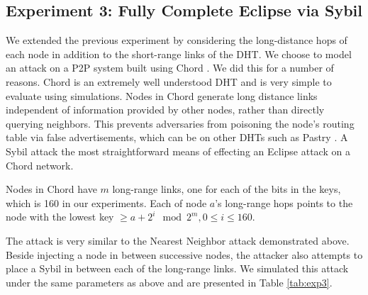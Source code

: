 \documentclass[a4paper]{article}
\begin{document}
\subsection{Experiment 3: Fully Complete Eclipse via Sybil}
We extended the previous experiment by considering the long-distance hops of each node in addition to the short-range links of the DHT.
We choose to model an attack on a P2P system built using Chord \cite{chord}.
We did this for a number of reasons.
Chord is an extremely well understood DHT and is very simple to evaluate using simulations.
Nodes in Chord generate long distance links independent of information provided by other nodes, rather than directly querying neighbors.
This prevents adversaries from poisoning the node's routing table via false advertisements, which can be on other DHTs such as Pastry \cite{pastry}. 
A Sybil attack the most straightforward means of effecting an Eclipse attack on a Chord network.

Nodes in Chord have $m$ long-range links, one for each of the bits in the keys, which is 160 in our experiments.
Each of node $a$'s long-range hops points to the node with the lowest key $\geq a + 2^{i} \mod 2^{m} , 0 \leq i \leq 160$.


The attack is very similar to the Nearest Neighbor attack demonstrated above.
Beside injecting a node in between successive nodes, the attacker also attempts to place a Sybil in between each of the long-range links.
We simulated this attack under the same parameters as above and are presented in Table \ref{tab:exp3}.
\end{document}

